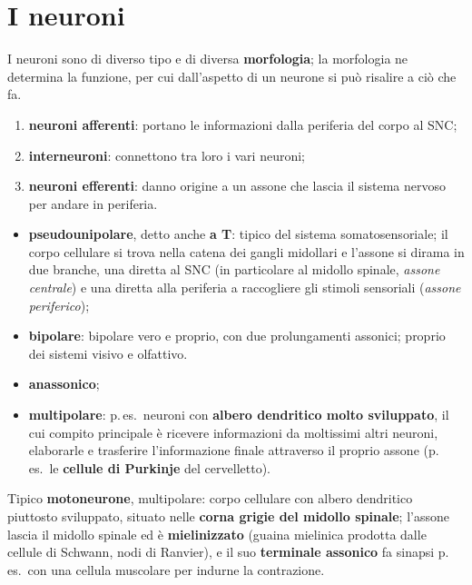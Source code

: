 \section{I neuroni}

I neuroni sono di diverso tipo e di diversa \textbf{morfologia}; la morfologia ne determina la
funzione, per cui dall'aspetto di un neurone si può risalire a ciò che fa.

\begin{enumerate}
  \item \textbf{neuroni afferenti}: portano le informazioni dalla periferia del corpo al SNC;
  \item \textbf{interneuroni}: connettono tra loro i vari neuroni;
  \item \textbf{neuroni efferenti}: danno origine a un assone che lascia il sistema nervoso per
    andare in periferia.
\end{enumerate}

\begin{itemize}
  \item \textbf{pseudounipolare}, detto anche \textbf{a T}: tipico del sistema somatosensoriale; il
    corpo cellulare si trova nella catena dei gangli midollari e l'assone si dirama in due branche,
    una diretta al SNC (in particolare al midollo spinale, \textit{assone centrale}) e una diretta
    alla periferia a raccogliere gli stimoli sensoriali (\textit{assone periferico});
  \item \textbf{bipolare}: bipolare vero e proprio, con due prolungamenti assonici; proprio dei
    sistemi visivo e olfattivo.
\end{itemize}

\begin{itemize}
  \item \textbf{anassonico};
  \item \textbf{multipolare}: p.\,es.\ neuroni con \textbf{albero dendritico molto sviluppato}, il
    cui compito principale è ricevere informazioni da moltissimi altri neuroni, elaborarle e
    trasferire l'informazione finale attraverso il proprio assone (p.\,es.\ le \textbf{cellule di
    Purkinje} del cervelletto).
\end{itemize}

Tipico \textbf{motoneurone}, multipolare: corpo cellulare con albero dendritico piuttosto
sviluppato, situato nelle \textbf{corna grigie del midollo spinale}; l'assone lascia il midollo
spinale ed è \textbf{mielinizzato} (guaina mielinica prodotta dalle cellule di Schwann, nodi di
Ranvier), e il suo \textbf{terminale assonico} fa sinapsi p.\,es.\ con una cellula muscolare per
indurne la contrazione.

